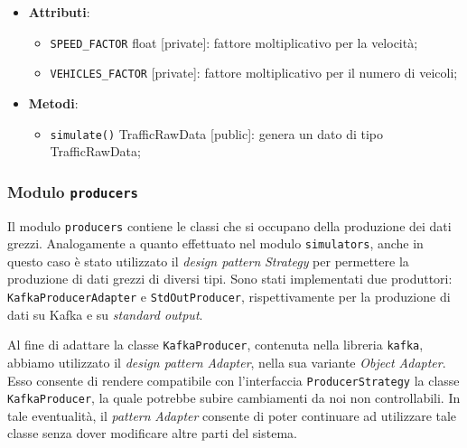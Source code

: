 \begin{itemize}
	      \begin{itemize}
	      \end{itemize}
	      \begin{itemize}
		      \item \textbf{Attributi}:
		            \begin{itemize}
			            \item \texttt{SPEED\_FACTOR} float [private]: fattore moltiplicativo per la velocità;
			            \item \texttt{VEHICLES\_FACTOR} [private]: fattore moltiplicativo per il numero di veicoli;
		            \end{itemize}
		      \item \textbf{Metodi}:
		            \begin{itemize}
			            \item \texttt{simulate()} TrafficRawData [public]: genera un dato di tipo TrafficRawData;
		            \end{itemize}
	      \end{itemize}

\end{itemize}

\subsubsection{Modulo \texttt{producers}}
Il modulo \texttt{producers} contiene le classi che si occupano della produzione dei dati grezzi.
Analogamente a quanto effettuato nel modulo \texttt{simulators}, anche in questo caso è stato utilizzato il \textit{design pattern} \textit{Strategy} per permettere la produzione di dati grezzi di diversi tipi.
Sono stati implementati due produttori: \texttt{KafkaProducerAdapter} e \texttt{StdOutProducer}, rispettivamente per la produzione di dati su Kafka e su \textit{standard output}.

Al fine di adattare la classe \texttt{KafkaProducer}, contenuta nella libreria \texttt{kafka}, abbiamo utilizzato il \textit{design pattern} \textit{Adapter}, nella sua variante
\textit{Object Adapter}. Esso consente di rendere compatibile con l'interfaccia \texttt{ProducerStrategy} la classe \texttt{KafkaProducer}, la quale potrebbe subire
cambiamenti da noi non controllabili. In tale eventualità, il \textit{pattern} \textit{Adapter} consente di poter continuare ad utilizzare tale classe senza dover modificare altre parti del sistema.


